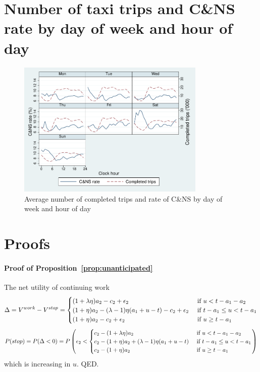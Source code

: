 \documentclass[reviewmode]{restat}
\begin{document}
\begin{appendices}
\section{Number of taxi trips and C\&NS rate by day of week and hour of day}
\FloatBarrier
\begin{figure}[!ht]
	\centering
	\includegraphics[width=0.8\textwidth]{./fg/dowplot.pdf}
	\caption{Average number of completed trips and rate of C\&NS by day of week and hour of day}
	\label{fg:trips}
\end{figure}


\FloatBarrier

\section{Proofs}
\label{apx:proofs}
\paragraph{Proof of Proposition~\ref{prop:unanticipated}} The net utility of continuing work
\[\Delta = V^{work} - V^{stop} = \begin{cases} 
(1+\lambda\eta)a_2 - c_2 + \epsilon_2 & \hbox{ if } u < t - a_1 - a_2 \\
(1+\eta)a_2 - (\lambda-1)\eta(a_1 + u - t) - c_2 + \epsilon_2 & \hbox{ if } t-a_1 \leq u < t - a_1 \\ 
(1+\eta)a_2 - c_2 + \epsilon_2 & \hbox{ if } u \geq t - a_1
\end{cases}\]
\[P(stop) = P(\Delta < 0) = P\left(\epsilon_2 < \begin{cases} 
c_2 - (1+\lambda\eta)a_2 & \hbox{ if } u < t - a_1 - a_2 \\
c_2 - (1+\eta)a_2 + (\lambda-1)\eta(a_1 + u - t) & \hbox{ if } t-a_1 \leq u < t - a_1 \\ 
c_2 - (1+\eta)a_2 & \hbox{ if } u \geq t - a_1\\
\end{cases}\right) 
\]
which is increasing in $u$. QED.


\end{appendices}
\end{document}
